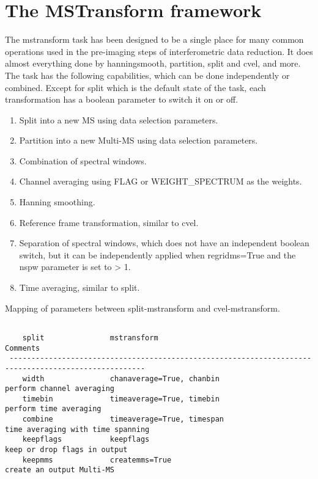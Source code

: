 

\section{The MSTransform framework}\label{Sec:Running}
The mstransform task has been designed to be a single place for many
common operations used in the pre-imaging steps of interferometric
data reduction. It does almost everything done by hanningsmooth,
partition, split and cvel, and more. The task has the following capabilities,
which can be done independently or combined. Except for split which is the default 
state of the task, each transformation has a boolean parameter to switch it on
or off.

\begin{enumerate}
\item Split into a new MS using data selection parameters.
\item Partition into a new Multi-MS using data selection parameters.
\item Combination of spectral windows.
\item Channel averaging using FLAG or WEIGHT_SPECTRUM as the weights.
\item Hanning smoothing.
\item Reference frame transformation, similar to cvel.
\item Separation of spectral windows, which does not have an independent
boolean switch, but it can be independently applied when regridms=True and
the nspw parameter is set to > 1.
\item Time averaging, similar to split.

\end{enumerate}

Mapping of parameters between split-mstransform and cvel-mstransform.

\begin{verbatim}

    split               mstransform                                      Comments
 -----------------------------------------------------------------------------------------------------
    width               chanaverage=True, chanbin                        perform channel averaging
    timebin             timeaverage=True, timebin                        perform time averaging
    combine             timeaverage=True, timespan                       time averaging with time spanning
    keepflags           keepflags                                        keep or drop flags in output
    keepmms             createmms=True                                   create an output Multi-MS

\end{verbatim}


